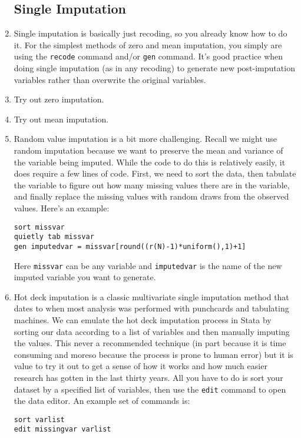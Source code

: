 \documentclass[a4paper,12pt]{article}
\begin{document}
\begin{enumerate}
\subsection*{Single Imputation}

\item Single imputation is basically just recoding, so you already know how to do it. For the simplest methods of zero and mean imputation, you simply are using the \texttt{recode} command and/or \texttt{gen} command. It's good practice when doing single imputation (as in any recoding) to generate new post-imputation variables rather than overwrite the original variables.
\item Try out zero imputation. %
\item Try out mean imputation. %
\item Random value imputation is a bit more challenging. Recall we might use random imputation because we want to preserve the mean and variance of the variable being imputed. While the code to do this is relatively easily, it does require a few lines of code. First, we need to sort the data, then tabulate the variable to figure out how many missing values there are in the variable, and finally replace the missing values with random draws from the observed values. Here's an example:
\begin{verbatim}
sort missvar
quietly tab missvar
gen imputedvar = missvar[round((r(N)-1)*uniform(),1)+1]
\end{verbatim}

Here \texttt{missvar} can be any variable and \texttt{imputedvar} is the name of the new imputed variable you want to generate.

\item Hot deck imputation is a classic multivariate single imputation method that dates to when most analysis was performed with punchcards and tabulating machines. We can emulate the hot deck imputation process in Stata by sorting our data according to a list of variables and then manually imputing the values. This never a recommended technique (in part because it is time consuming and moreso because the process is prone to human error) but it is value to try it out to get a sense of how it works and how much easier research has gotten in the last thirty years. All you have to do is sort your dataset by a specified list of variables, then use the \texttt{edit} command to open the data editor. An example set of commands is:
\begin{verbatim}
sort varlist
edit missingvar varlist
\end{verbatim}


\end{enumerate}
\end{document}
